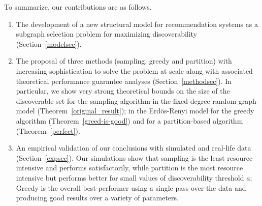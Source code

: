 To summarize, our contributions are as follows.
\begin{enumerate}
\item The development of a new structural model for recommendation systems as a subgraph selection problem for maximizing discoverability (Section~\ref{modelsec}).
\item The proposal of three methods (sampling, greedy and partition) with increasing sophistication to solve the problem at scale along with associated theoretical performance guarantee analyses (Section~\ref{methodsec}). In particular, we show very strong theoretical bounds on the size of the discoverable set for the sampling algorithm in the fixed degree random graph model (Theorem~\ref{original_result}); in the Erd\"os-Renyi model for the greedy algorithm (Theorem~\ref{greed-is-good}) and for a partition-based algorithm (Theorem~\ref{perfect}).
\item An empirical validation of our conclusions with simulated and real-life data (Section~\ref{expsec}). Our simulations show that sampling is the least resource intensive and performs satisfactorily, while partition is the most resource intensive but performs better for small values of discoverability threshold $a$; Greedy is the overall best-performer using a single pass over the data and producing good results over a variety of parameters. 
\end{enumerate}
